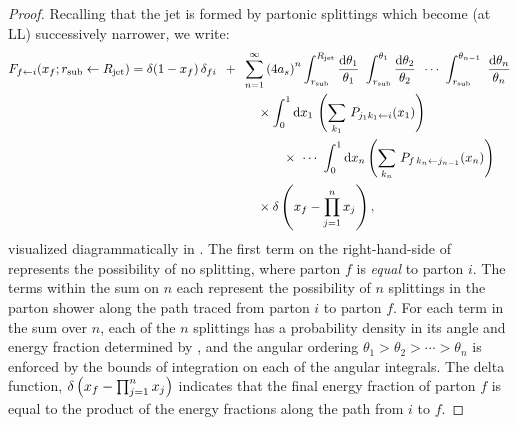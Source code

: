 \begin{proof}
Recalling that the jet is formed by partonic splittings which become (at LL) successively narrower, we write:
\begin{align}
    F_{f \leftarrow i}(x_f; \rsub \leftarrow \Rjet)
    &=
    \delta(1-x_f) \, \delta_{fi}
    \,\,\,
    +
    \,\,\,
    \sum_{n = 1}^\infty
    \le( 4 a_s \ri)^n
    \int^{\Rjet}_{\rsub} \frac{\dd\theta_1}{\theta_1}
    \,\,
    \int^{\theta_1}_{\rsub} \frac{\dd\theta_2}{\theta_2}
    \,\,\,
    \cdots
    \,\,
    \int^{\theta_{n-1}}_{\rsub}
    \,\,
    \frac{\dd\theta_n}{\theta_n}
    \notag
    \\
    &\qquad\qquad\qquad\qquad\qquad
    \label{eq:shower_fragmentation}
    \times
    \int_0^1 \dd x_1
    \,
    \le(\sum_{k_1}\,P_{j_1 k_1 \leftarrow i}(x_1)\ri)
    \\
    \notag
    &\qquad\qquad\qquad\qquad\qquad\qquad
    \times
    \,\,
    \cdots
    \,\,
    \int_0^1 \dd x_n
    \le(\sum_{k_n}\,P_{f\,k_n \leftarrow j_{n-1}}(x_n)\ri)
    \\
    \notag
    &\qquad\qquad\qquad\qquad\qquad
    \times
    \delta\le(x_f - \prod_{j=1}^n x_j\ri)
     ,
\end{align}
visualized diagrammatically in .
%
The first term on the right-hand-side of  represents the possibility of no splitting, where parton \(f\) is \emph{equal} to parton \(i\).
%
The terms within the sum on \(n\) each represent the possibility of \(n\) splittings in the parton shower along the path traced from parton \(i\) to parton \(f\).
%
For each term in the sum over \(n\), each of the \(n\) splittings has a probability density in its angle and energy fraction determined by , and the angular ordering \(\theta_1 > \theta_2 > \cdots > \theta_n\) is enforced by the bounds of integration on each of the angular integrals.
%
The delta function, \(\delta\left(x_f - \prod_{j = 1}^n x_j\right)\) indicates that the final energy fraction of parton \(f\) is equal to the product of the energy fractions along the path from \(i\) to \(f\).



\end{proof}
